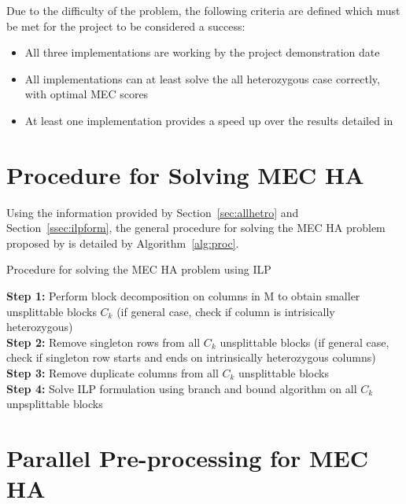 \documentclass[10pt,twocolumn]{article}
\begin{document}
Due to the difficulty of the problem, the following criteria are defined which must be met for the project to
be considered a success:
\begin{itemize}[noitemsep]
    \item{All three implementations are working by the project demonstration date}
    \item{All implementations can at least solve the all heterozygous case correctly, with optimal MEC scores}
    \item{At least one implementation provides a speed up over the results detailed in \cite{chen:2013} }
\end{itemize}


\section{Procedure for Solving MEC HA}

Using the information provided by Section~\ref{sec:allhetro} and Section~\ref{ssec:ilpform}, the general
procedure for solving the MEC HA problem proposed by \cite{chen:2013} is detailed by Algorithm~\ref{alg:proc}.
\begin{algorithm}[h!]
    \small
    \caption{Procedure for solving the MEC HA problem using ILP}
    \label{alg:proc}
\textbf{Step 1:} Perform block decomposition on columns in M to obtain smaller unsplittable blocks $C_k$ (if 
general case, check if column is intrisically heterozygous)                                                       \\
\textbf{Step 2:} Remove singleton rows from all $C_k$ unsplittable blocks (if general case, check 
if singleton row starts and ends on intrinsically heterozygous columns)                                          \\
\textbf{Step 3:} Remove duplicate columns from all $C_k$ unsplittable blocks 							        \\
\textbf{Step 4:} Solve ILP formulation using branch and bound algorithm on all $C_k$ unpsplittable blocks 
\end{algorithm}


\section{Parallel Pre-processing for MEC HA } \label{sec:parpre}
\end{document}
